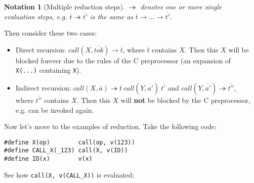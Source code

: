 \documentclass[12pt]{article}
\theoremstyle{break}
\newtheorem{notation}{Notation}
\begin{document}
\begin{notation}[Multiple reduction steps]
    $\twoheadrightarrow$ denotes one or more single evaluation steps, e.g.
    $\overline{t} \twoheadrightarrow \overline{t'}$ is the same as
    $\overline{t} \to \ldots \to \overline{t'}$.
\end{notation}

Then consider these two cases:

\begin{itemize}
    \item Direct recursion: $call(X, \overline{tok}) \to \overline{t}$, where
    $\overline{t}$ contains $X$. Then this $X$ will be blocked forever due to the
    rules of the C preprocessor (an expansion of \texttt{X(...)} containing
    \texttt{X}).

    \item Indirect recursion: $call(X, \overline{a}) \twoheadrightarrow
    \overline{t} \ call(Y, \overline{a'}) \ \overline{t'}$ and
    $call(Y, \overline{a'}) \twoheadrightarrow \overline{t''}$, where $\overline{t''}$
    contains $X$. Then this $X$ will \textbf{not} be blocked by the C preprocessor,
    e.g. can be invoked again.
\end{itemize}

Now let's move to the examples of reduction. Take the following code:

\begin{verbatim}
#define X(op)        call(op, v(123))
#define CALL_X(_123) call(X, v(ID))
#define ID(x)        v(x)
\end{verbatim}

See how \texttt{call(X, v(CALL\_X))} is evaluated:
\end{document}
